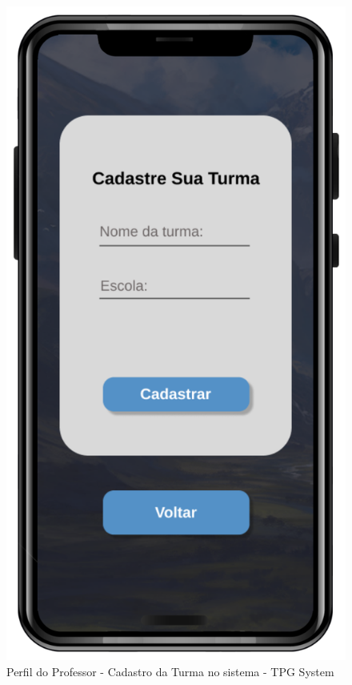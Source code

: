 \begin{figure}[!h]
\centering
\caption{Perfil do Professor - Cadastro da Turma no sistema - TPG System}%
\label{fig:Tela7}
\includegraphics[scale=0.20]{Illustrations/Tela7.png}
\end{figure}

